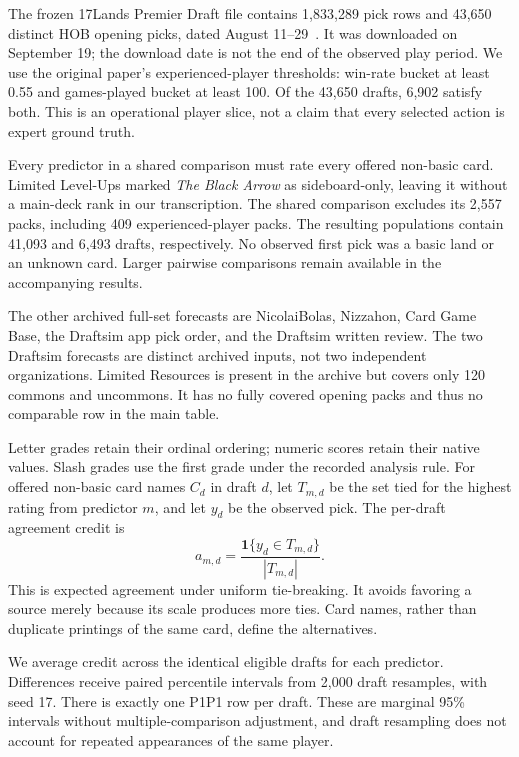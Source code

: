 \documentclass[11pt]{article}
\begin{document}
The frozen 17Lands Premier Draft file contains 1,833,289 pick rows and
43,650 distinct HOB opening picks, dated August 11--29~\cite{lands}. It was
downloaded on September 19; the download date is not the end of the observed
play period. We use the original paper's experienced-player thresholds:
win-rate bucket at least 0.55 and games-played bucket at least 100. Of the
43,650 drafts, 6,902 satisfy both. This is an operational player slice, not
a claim that every selected action is expert ground truth.

Every predictor in a shared comparison must rate every offered non-basic
card. Limited Level-Ups marked \emph{The Black Arrow} as sideboard-only,
leaving it without a main-deck rank in our transcription. The shared
comparison excludes its 2,557 packs, including 409 experienced-player packs.
The resulting populations contain 41,093 and 6,493 drafts, respectively.
No observed first pick was a basic land or an unknown card. Larger pairwise
comparisons remain available in the accompanying results.

The other archived full-set forecasts are NicolaiBolas, Nizzahon, Card Game
Base, the Draftsim app pick order, and the Draftsim written review. The two
Draftsim forecasts are distinct archived inputs, not two independent
organizations. Limited Resources is present in the archive but covers only
120 commons and uncommons. It has no fully covered opening packs and thus
no comparable row in the main table.

Letter grades retain their ordinal ordering; numeric scores retain their
native values. Slash grades use the first grade under the recorded analysis
rule. For offered non-basic card names $C_d$ in draft $d$, let $T_{m,d}$ be
the set tied for the highest rating from predictor $m$, and let $y_d$ be the
observed pick. The per-draft agreement credit is
\begin{equation}
 a_{m,d}=\frac{\mathbf{1}\{y_d\in T_{m,d}\}}{|T_{m,d}|}.
\end{equation}
This is expected agreement under uniform tie-breaking. It avoids favoring
a source merely because its scale produces more ties. Card names, rather
than duplicate printings of the same card, define the alternatives.

We average credit across the identical eligible drafts for each predictor.
Differences receive paired percentile intervals from 2,000 draft resamples,
with seed 17. There is exactly one P1P1 row per draft. These are marginal
95\% intervals without multiple-comparison adjustment, and draft resampling
does not account for repeated appearances of the same player.
\end{document}
